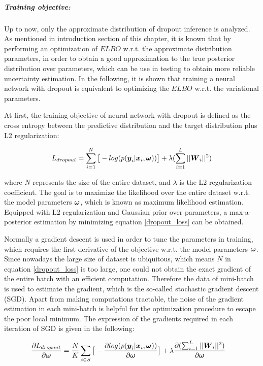 \subparagraph{Training objective:} Up to now, only the approximate distribution of dropout inference is analyzed. 
As mentioned in introduction section of this chapter, it is known that by performing an optimization of $ELBO$ w.r.t. the approximate distribution parameters, in order to obtain a good approximation to the true posterior distribution over parameters, which can be use in testing to obtain more reliable uncertainty estimation. 
In the following, it is shown that training a neural network with dropout is equivalent to optimizing the $ELBO$ w.r.t. the variational parameters.

At first, the training objective of neural network with dropout is defined as the cross entropy between the predictive distribution and the target distribution plus L2 regularization:

\begin{equation}
\begin{aligned} \label{dropout_loss}
L_{dropout}   = \sum_{i=1}^{N}\big[-log(p(\boldsymbol y_{i}| \boldsymbol x_{i}, \boldsymbol \omega))\big] + \lambda(\sum_{i=1}^{L} ||\boldsymbol W_{i}||^{2})
\end{aligned}
\end{equation}

where $N$ represents the size of the entire dataset, and $\lambda$ is the L2 regularization coefficient. The goal is to maximize the likelihood over the entire dataset w.r.t. the model parameters $\boldsymbol \omega$, which is known as maximum likelihood estimation. Equipped with L2 regularization and Gaussian prior over parameters, a max-a-posterior estimation by minimizing equation \ref{dropout_loss} can be obtained. 

Normally a gradient descent is used in order to tune the parameters in training, which requires the first derivative of the objective w.r.t. the model parameters $\boldsymbol \omega$. Since nowadays the large size of dataset is ubiquitous, which means $N$ in equation \ref{dropout_loss} is too large, one could not obtain the exact gradient of the entire batch with an efficient computation. Therefore the data of mini-batch is used to estimate the gradient, which is the so-called stochastic gradient descent (SGD). Apart from making computations tractable, the noise of the gradient estimation in each mini-batch is helpful for the optimization procedure to escape the poor local minimum. The expression of the gradients required in each iteration of SGD is given in the following:

\begin{equation}
\begin{aligned} \label{dropout_grad}
\frac{\partial L_{dropout}}{\partial \boldsymbol \omega} &=\frac{N}{K}\sum_{i \in S}\big[-\frac{\partial log(p(\boldsymbol y_{i}| \boldsymbol x_{i}, \boldsymbol \omega))}{\partial \boldsymbol \omega}\big] + \lambda\frac{\partial (\sum_{i=1}^{L} ||\boldsymbol W_{i}||^{2})}{\partial \boldsymbol \omega}
\end{aligned}
\end{equation}

